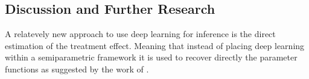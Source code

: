 \subsection{Discussion and Further Research}


A relatevely new approach to use deep learning for inference is the direct estimation of the treatment effect.
Meaning that instead of placing deep learning within a semiparametric framework it is used to recover directly the parameter functions as suggested by the work of \citet{DeepLearningIndividual2021}.
